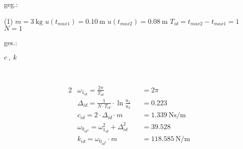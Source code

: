 %


    

    \begin{minipage}[t]{.49\linewidth}
        geg.:
        \begin{tasks} (1)
           \task[] $m = \SI{3}{\kilo\gram}$
           \task[] $u(t_{max1}) = \SI{0.10}{\meter}$
           \task[] $u(t_{max2}) = \SI{0.08}{\meter}$
           \task[] $T_{id} = t_{max2}-t_{max1} = 1$
           \task[] $N = 1$
        \end{tasks}
        \end{minipage}
        \begin{minipage}[t]{.49\linewidth}
        ges.:
        \begin{tasks}
            \task$c ~,~ k$
        \end{tasks}
    \end{minipage}\\
    \vspace{1cm}


    \begin{solution}
        \begin{alignat*}{2}
            &\omega_{1_{id}} = \frac{2 \pi}{T_{id}} &&= 2 \pi\\
            &\Delta_{id} = \frac{1}{N \cdot T_{id} } \cdot \ln{\frac{u_1}{u_2}} &&= 0.223\\
            &c_{id} = 2 \cdot \Delta_{id} \cdot m &&= \SI{1.339}{\newton \second \per \meter}\\
            &\omega_{0_{id^2}} = \omega_{1_{id}}^2 + \Delta_{id}^2 &&= 39.528\\
            &k_{id} = \omega_{0_{id^2}} \cdot m &&= \SI{118.585}{\newton \per \meter}\\
        \end{alignat*}
    \end{solution}




